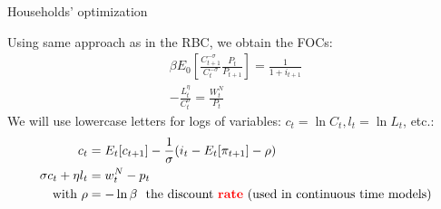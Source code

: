 \documentclass{beamer}
\newcommand{\tb}[1]{{\color{blue}{\textbf{#1}}}}
\newcommand{\tr}[1]{{\color{red}{\textbf{#1}}}}
\newenvironment{mytemize}
{\vfill\itemize[nolistsep,itemsep=\fill,label=\color{blue}{$\triangleright$}]}
  {\enditemize}
\begin{document}
%
%
\begin{frame}{Households' optimization} 

Using same approach as in the RBC, we obtain the FOCs: 
\begin{align*}
\beta E_0 \left[ \frac{C_{t+1}^{-\sigma}}{C_t^{-\sigma}} \frac{P_t}{P_{t+1}}\right] = \frac{1}{1+i_{t+1}} \\
-\frac{L_t^{\eta}}{C_t^{\sigma}}= \frac{W^N_t}{P_t} 
\end{align*}
\vfill
We will use lowercase letters for logs of variables: $c_t = \ln C_t, l_t = \ln L_t$, etc.:
\begin{align*}
c_t &= E_t[c_{t+1}] -\frac{1}{\sigma} (i_t-E_t[\pi_{t+1}]-\rho)  \\
\sigma c_t + \eta l_t &= w^N_t - p_t  \\
\text{with } \rho &= -\ln \beta \ \ \text{the discount \tr{rate} (used in continuous time models)}
\end{align*}

\end{frame}
%
\end{document}
